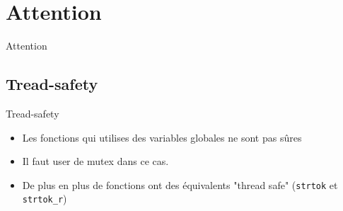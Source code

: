 \def\sectitle{Attention}
\section{\sectitle}
\begin{frame}[containsverbatim]{\sectitle}
    \def\subsectitle{Tread-safety}
    \subsection{\subsectitle}
    \begin{block}{\subsectitle}
        \begin{itemize}
            \item Les fonctions qui utilises des variables globales ne sont pas
                sûres
            \item Il faut user de mutex dans ce cas.
            \item De plus en plus de fonctions ont des équivalents "thread safe"
                (\verb+strtok+ et \verb+strtok_r+)
        \end{itemize}
    \end{block}
\end{frame}


\def\sectitle{Threads en Java}
